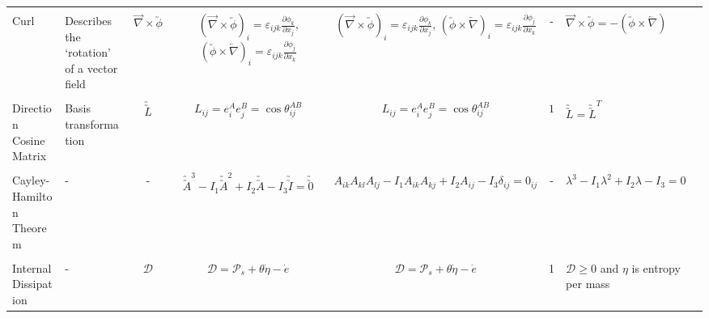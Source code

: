 \documentclass[10pt]{article}
\begin{document}
\begin{center}
\begin{tabular}{l m{3in} c c c c m{5in}}
\\[1ex]
\hline
\\[-1ex]
Curl
&%
Describes the `rotation' of a vector field
&%
$ \overrightarrow{\nabla}\times\utilde{\phi} $
&%
$ (\overrightarrow{\nabla}\times\utilde{\phi})_{i} =\varepsilon_{ijk}\frac{\partial \phi_{k}}{\partial x_{j}}$,  $(\utilde{\phi}\times\overleftarrow{\nabla})_{i}=\varepsilon_{ijk}\frac{\partial \phi_{j}}{\partial x_{k}}$
&%
$ (\overrightarrow{\nabla}\times\utilde{\phi})_{i} =\varepsilon_{ijk}\frac{\partial \phi_{k}}{\partial x_{j}}$,  $(\utilde{\phi}\times\overleftarrow{\nabla})_{i}=\varepsilon_{ijk}\frac{\partial \phi_{j}}{\partial x_{k}}$
&%
-
&%
$ \overrightarrow{\nabla}\times\utilde{\phi} =-(\utilde{\phi}\times\overleftarrow{\nabla}) $
\\[1ex]
\hline
\\[-1ex]
Direction Cosine Matrix
&%
Basis transformation
&%
$ \utilde{\utilde{L}} $
&%
$ L_{ij}=e_{i}^{A}e_{j}^{B} = \cos\theta_{ij}^{AB} $
&%
$ L_{ij}=e_{i}^{A}e_{j}^{B} = \cos\theta_{ij}^{AB} $
&%
$ 1 $
&%
$\utilde{\utilde{L}}=\utilde{\utilde{L}}^{T}$
\\[1ex]
\hline
\\[-1ex]
Cayley-Hamilton Theorem
&%
-
&%
-
&%
$\utilde{\utilde{A}}^{3}-I_{1}\utilde{\utilde{A}}^{2}+I_{2}\utilde{\utilde{A}}-I_{3} \utilde{\utilde{I}}= \utilde{\utilde{0}} $
&%
$A_{ik} A_{kl} A_{lj} - I_1 A_{ik} A_{kj} + I_2 A_{ij} - I_3 \delta_{ij} = 0_{ij}   $
&%
-
&%
$\lambda^{3}-I_{1}\lambda^{2}+I_{2}\lambda-I_{3}=0$
\\[1ex]
\hline
\\[-1ex]
Internal Dissipation
&%
-
&%
$ \mathcal{D} $
&%
$ \mathcal{D} = \mathcal{P}_{s} + \theta\dot{\eta}-\dot{e} $
&%
$ \mathcal{D} = \mathcal{P}_{s} + \theta\dot{\eta}-\dot{e} $
&%
1
&%
$\mathcal{D} \geq 0$ and $\eta$ is entropy per mass
\\[1ex]

\end{tabular}
\end{center}
\end{document}
